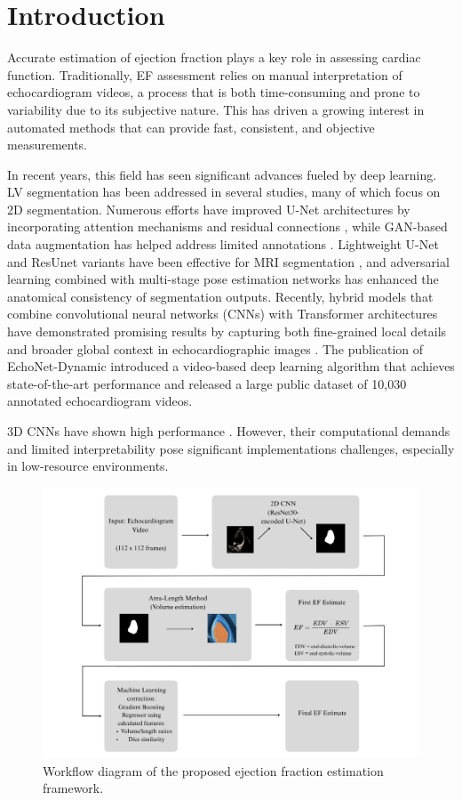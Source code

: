 \documentclass[runningheads]{llncs}
\begin{document}
\section{Introduction}

Accurate estimation of ejection fraction plays a key role in assessing cardiac function. Traditionally, EF assessment relies on manual interpretation of echocardiogram videos, a process that is both time-consuming and prone to variability due to its subjective nature. This has driven a growing interest in automated methods that can provide fast, consistent, and objective measurements.

In recent years, this field has seen significant advances fueled by deep learning. LV segmentation has been addressed in several studies, many of which focus on 2D segmentation. Numerous efforts have improved U-Net architectures by incorporating attention mechanisms and residual connections \cite{azarmehr2020automated}\cite{moradi2019mfp}, while GAN-based data augmentation has helped address limited annotations \cite{kumar2025enhancing}. Lightweight U-Net and ResUnet variants have been effective for MRI segmentation \cite{irshad2023lightunet}\cite{xu2022resunet}, and adversarial learning combined with multi-stage pose estimation networks has enhanced the anatomical consistency of segmentation outputs\cite{wu2021automated}. Recently, hybrid models that combine convolutional neural networks (CNNs) with Transformer architectures have demonstrated promising results by capturing both fine-grained local details and broader global context in echocardiographic images \cite{shi2024study}. The publication of EchoNet-Dynamic\cite{ouyang2020echonet} introduced a video-based deep learning algorithm that achieves state-of-the-art performance and released a large public dataset of 10,030 annotated echocardiogram videos.

3D CNNs have shown high performance \cite{Ali2025}. However, their computational demands and limited interpretability pose significant implementations challenges, especially in low-resource environments. 

\begin{figure}
    \centering
    \includegraphics[width=0.8\linewidth]{diagram.png}
    \caption{Workflow diagram of the proposed ejection fraction estimation framework.}
    \label{fig:workflow-diagram}
\end{figure}
\end{document}
